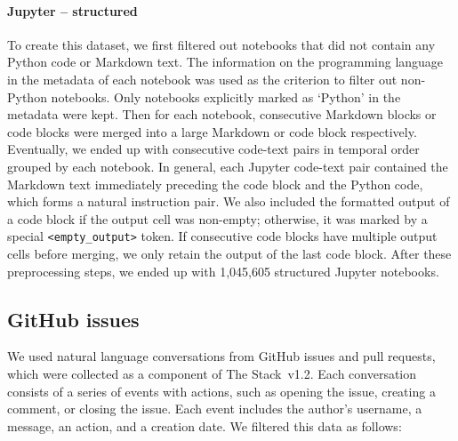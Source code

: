 \paragraph{Jupyter -- structured} To create this dataset, we first filtered out notebooks that did not contain any Python code or Markdown text. The information on the programming language in the metadata of each notebook was used as the criterion to filter out non-Python notebooks. Only notebooks explicitly marked as `Python' in the metadata were kept. Then for each notebook, consecutive Markdown blocks or code blocks were merged into a large Markdown or code block respectively. Eventually, we ended up with consecutive code-text pairs in temporal order grouped by each notebook. In general, each Jupyter code-text pair contained the Markdown text immediately preceding the code block and the Python code, which forms a natural instruction pair. We also included the formatted output of a code block if the output cell was non-empty; otherwise, it was marked by a special \texttt{<empty\_output>} token. If consecutive code blocks have multiple output cells before merging, we only retain the output of the last code block. After these preprocessing steps, we ended up with 1,045,605 structured Jupyter notebooks.

\subsection{GitHub issues} We used natural language conversations from GitHub issues and pull requests, which were collected as a component of The Stack~v1.2. Each conversation consists of a series of events with actions, such as opening the issue, creating a comment, or closing the issue. Each event includes the author’s username, a message, an action, and a creation date. We filtered this data as follows:

